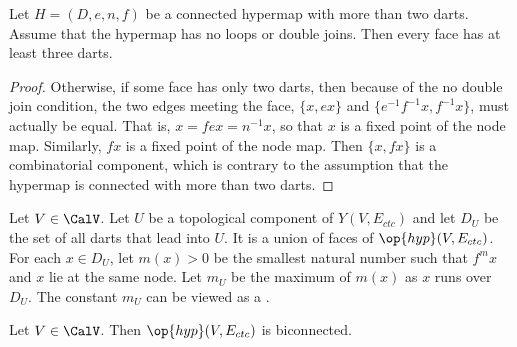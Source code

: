 \begin{lemma}\label{lemma:dj}
Let $H=(D,e,n,f)$ be a connected hypermap with more than
two darts.  Assume that the hypermap has no loops or double joins. Then
every face has at least three darts.
\end{lemma}

\begin{proof}
  Otherwise, if some face has only two darts, then because of the no
  double join condition, the two edges meeting the face, $\{x, e x\}$
  and $\{ e^{-1} f^{-1} x, f^{-1} x\}$, must actually be equal.  That
  is, $ x = f e x = n^{-1} x$, so that $x$ is a fixed point of the node
  map.  Similarly, $f x$ is a fixed point of the node map.  Then $\{x,
  f x\}$ is a combinatorial component, which is contrary to the
  assumption that the hypermap is connected with more than two darts.
\end{proof}


\begin{definition}[$D_U$,~$m_U$]
  Let $V\in \CalV$.  Let $U$ be a topological component of
  $Y(V,E_{ctc})$ and let $D_U$ be the set of all darts that lead into
  $U$.  It is a union of faces of $\op{hyp}(V,E_{ctc})$.  For each
  $x\in D_U$, let $m(x) >0$ be the smallest natural number such that
  $f^{m} x$ and $x$ lie at the same node.  Let $m_U$ be the maximum of
  $m(x)$  as $x$ runs over $D_U$.  The constant $m_U$ can be viewed as
  a .  %
\end{definition}

\begin{lemma}[biconnected]\label{lemma:biconnected}
  Let $V\in \CalV$.  Then $\op{hyp}(V,E_{ctc})$ is biconnected.
\end{lemma}

